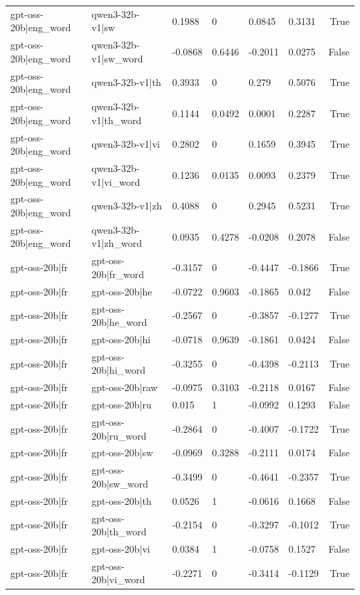 \begin{table}
\begin{tabular}{llllllr}
gpt-oss-20b|eng_word & qwen3-32b-v1|sw & 0.1988 & 0 & 0.0845 & 0.3131 & True \\
gpt-oss-20b|eng_word & qwen3-32b-v1|sw_word & -0.0868 & 0.6446 & -0.2011 & 0.0275 & False \\
gpt-oss-20b|eng_word & qwen3-32b-v1|th & 0.3933 & 0 & 0.279 & 0.5076 & True \\
gpt-oss-20b|eng_word & qwen3-32b-v1|th_word & 0.1144 & 0.0492 & 0.0001 & 0.2287 & True \\
gpt-oss-20b|eng_word & qwen3-32b-v1|vi & 0.2802 & 0 & 0.1659 & 0.3945 & True \\
gpt-oss-20b|eng_word & qwen3-32b-v1|vi_word & 0.1236 & 0.0135 & 0.0093 & 0.2379 & True \\
gpt-oss-20b|eng_word & qwen3-32b-v1|zh & 0.4088 & 0 & 0.2945 & 0.5231 & True \\
gpt-oss-20b|eng_word & qwen3-32b-v1|zh_word & 0.0935 & 0.4278 & -0.0208 & 0.2078 & False \\
gpt-oss-20b|fr & gpt-oss-20b|fr_word & -0.3157 & 0 & -0.4447 & -0.1866 & True \\
gpt-oss-20b|fr & gpt-oss-20b|he & -0.0722 & 0.9603 & -0.1865 & 0.042 & False \\
gpt-oss-20b|fr & gpt-oss-20b|he_word & -0.2567 & 0 & -0.3857 & -0.1277 & True \\
gpt-oss-20b|fr & gpt-oss-20b|hi & -0.0718 & 0.9639 & -0.1861 & 0.0424 & False \\
gpt-oss-20b|fr & gpt-oss-20b|hi_word & -0.3255 & 0 & -0.4398 & -0.2113 & True \\
gpt-oss-20b|fr & gpt-oss-20b|raw & -0.0975 & 0.3103 & -0.2118 & 0.0167 & False \\
gpt-oss-20b|fr & gpt-oss-20b|ru & 0.015 & 1 & -0.0992 & 0.1293 & False \\
gpt-oss-20b|fr & gpt-oss-20b|ru_word & -0.2864 & 0 & -0.4007 & -0.1722 & True \\
gpt-oss-20b|fr & gpt-oss-20b|sw & -0.0969 & 0.3288 & -0.2111 & 0.0174 & False \\
gpt-oss-20b|fr & gpt-oss-20b|sw_word & -0.3499 & 0 & -0.4641 & -0.2357 & True \\
gpt-oss-20b|fr & gpt-oss-20b|th & 0.0526 & 1 & -0.0616 & 0.1668 & False \\
gpt-oss-20b|fr & gpt-oss-20b|th_word & -0.2154 & 0 & -0.3297 & -0.1012 & True \\
gpt-oss-20b|fr & gpt-oss-20b|vi & 0.0384 & 1 & -0.0758 & 0.1527 & False \\
gpt-oss-20b|fr & gpt-oss-20b|vi_word & -0.2271 & 0 & -0.3414 & -0.1129 & True \\

\end{tabular}
\end{table}
